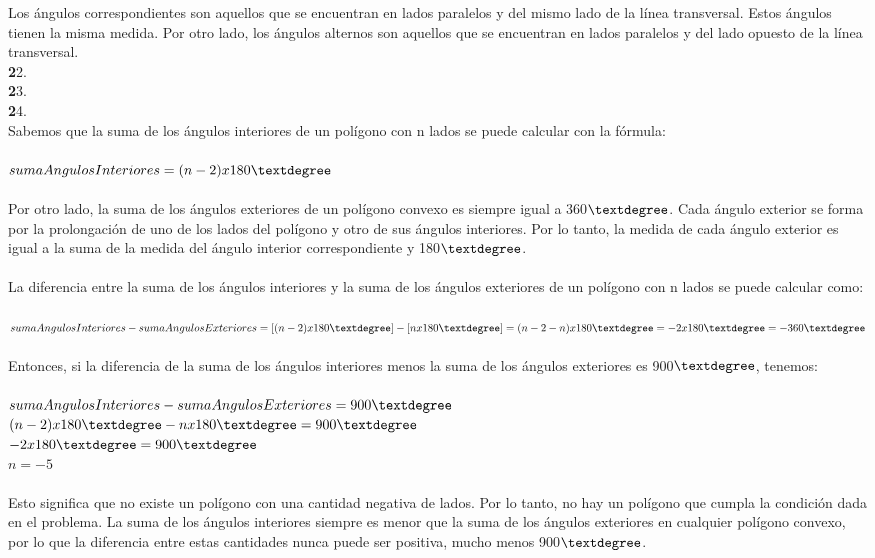 \documentclass{article}
\begin{document}
Los ángulos correspondientes son aquellos que se encuentran en lados paralelos y del mismo lado de la línea transversal. Estos ángulos tienen la misma medida. Por otro lado, los ángulos alternos son aquellos que se encuentran en lados paralelos y del lado opuesto de la línea transversal.\\
{\textbf 22. }\\
{\textbf 23. }\\
{\textbf 24. }\\
Sabemos que la suma de los ángulos interiores de un polígono con n lados se puede calcular con la fórmula:\\
\\
$sumaAngulosInteriores = (n - 2) x 180\textdegree$\\
\\
Por otro lado, la suma de los ángulos exteriores de un polígono convexo es siempre igual a 360$\textdegree$. Cada ángulo exterior se forma por la prolongación de uno de los lados del polígono y otro de sus ángulos interiores. Por lo tanto, la medida de cada ángulo exterior es igual a la suma de la medida del ángulo interior correspondiente y 180$\textdegree$.\\
\\
La diferencia entre la suma de los ángulos interiores y la suma de los ángulos exteriores de un polígono con n lados se puede calcular como:\\
\\
$sumaAngulosInteriores - sumaAngulosExteriores = [(n - 2) x 180\textdegree] - [n x 180\textdegree] = (n - 2 - n) x 180\textdegree = -2 x 180\textdegree = -360\textdegree$\\
\\
Entonces, si la diferencia de la suma de los ángulos interiores menos la suma de los ángulos exteriores es 900$\textdegree$, tenemos:\\
\\
$sumaAngulosInteriores - sumaAngulosExteriores = 900\textdegree$\\
$(n - 2) x 180\textdegree - n x 180\textdegree = 900\textdegree$\\
$-2 x 180\textdegree = 900\textdegree$\\
$n = -5$\\
\\
Esto significa que no existe un polígono con una cantidad negativa de lados. Por lo tanto, no hay un polígono que cumpla la condición dada en el problema. La suma de los ángulos interiores siempre es menor que la suma de los ángulos exteriores en cualquier polígono convexo, por lo que la diferencia entre estas cantidades nunca puede ser positiva, mucho menos 900$\textdegree$.\\
\end{document}
